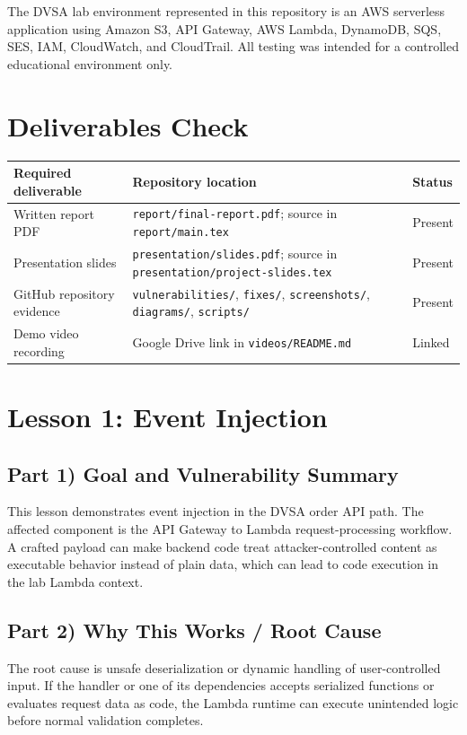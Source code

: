 \documentclass[12pt]{article}
\begin{document}
The DVSA lab environment represented in this repository is an AWS serverless application using Amazon S3, API Gateway, AWS Lambda, DynamoDB, SQS, SES, IAM, CloudWatch, and CloudTrail. All testing was intended for a controlled educational environment only.

\section*{Deliverables Check}

\begin{longtable}{p{}p{}p{}}
\toprule
Required deliverable & Repository location & Status \\
\midrule
Written report PDF & \texttt{report/final-report.pdf}; source in \texttt{report/main.tex} & Present \\
Presentation slides & \texttt{presentation/slides.pdf}; source in \texttt{presentation/project-slides.tex} & Present \\
GitHub repository evidence & \texttt{vulnerabilities/}, \texttt{fixes/}, \texttt{screenshots/}, \texttt{diagrams/}, \texttt{scripts/} & Present \\
Demo video recording & Google Drive link in \texttt{videos/README.md} & Linked \\
\bottomrule
\end{longtable}

\clearpage
\section{Lesson 1: Event Injection}

\subsection*{Part 1) Goal and Vulnerability Summary}
This lesson demonstrates event injection in the DVSA order API path. The affected component is the API Gateway to Lambda request-processing workflow. A crafted payload can make backend code treat attacker-controlled content as executable behavior instead of plain data, which can lead to code execution in the lab Lambda context.

\subsection*{Part 2) Why This Works / Root Cause}
The root cause is unsafe deserialization or dynamic handling of user-controlled input. If the handler or one of its dependencies accepts serialized functions or evaluates request data as code, the Lambda runtime can execute unintended logic before normal validation completes.
\end{document}
